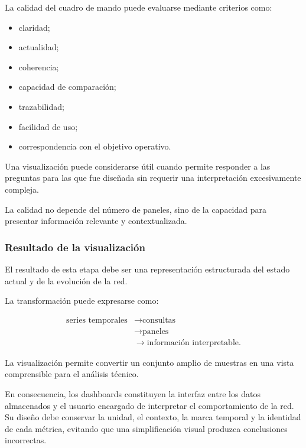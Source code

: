 La calidad del cuadro de mando puede evaluarse mediante criterios como:

\begin{itemize}
    \item claridad;

    \item actualidad;

    \item coherencia;

    \item capacidad de comparación;

    \item trazabilidad;

    \item facilidad de uso;

    \item correspondencia con el objetivo operativo.
\end{itemize}

Una visualización puede considerarse útil cuando permite responder a las
preguntas para las que fue diseñada sin requerir una interpretación
excesivamente compleja.

La calidad no depende del número de paneles, sino de la capacidad para
presentar información relevante y contextualizada.


\subsubsection*{Resultado de la visualización}

El resultado de esta etapa debe ser una representación estructurada del
estado actual y de la evolución de la red.

La transformación puede expresarse como:

\[
\begin{aligned}
    \text{series temporales}
    &\longrightarrow
    \text{consultas}\\
    &\longrightarrow
    \text{paneles}\\
    &\longrightarrow
    \text{información interpretable}.
\end{aligned}
\]

La visualización permite convertir un conjunto amplio de muestras en una
vista comprensible para el análisis técnico.

En consecuencia, los dashboards constituyen la interfaz entre los datos
almacenados y el usuario encargado de interpretar el comportamiento de la
red. Su diseño debe conservar la unidad, el contexto, la marca temporal y
la identidad de cada métrica, evitando que una simplificación visual
produzca conclusiones incorrectas.

